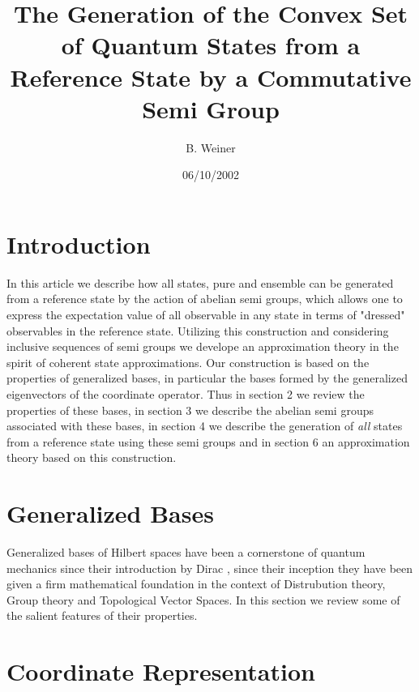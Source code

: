 \documentclass[aps,preprint]{revtex4}%
\begin{document}
\title[State Generation]{The Generation of the Convex Set of Quantum States from a Reference State by a
Commutative Semi Group }
\author{B. Weiner}
\keywords{}
\pacs{}

\begin{abstract}


\end{abstract}
\date{06/10/2002}
\maketitle
\tableofcontents


\section{Introduction}

In this article we describe how all states, pure and ensemble can be generated
from a reference state by the action of abelian semi groups, which allows one
to express the expectation value of all observable in any state in terms of
"dressed" observables in the reference state. Utilizing this construction and
considering inclusive sequences of semi groups we develope an approximation
theory in the spirit of coherent state approximations. Our construction is
based on the properties of generalized bases, in particular the bases formed
by the generalized eigenvectors of the coordinate operator. Thus in section 2
we review the properties of these bases, in section 3 we describe the abelian
semi groups associated with these bases, in section 4 we describe the
generation of \emph{all} states from a reference state using these semi groups
and in section 6 an approximation theory based on this construction.

\section{Generalized Bases}

Generalized bases of Hilbert spaces have been a cornerstone of quantum
mechanics since their introduction by Dirac \cite{Dirac}, since their
inception they have been given a  firm mathematical foundation in the context
of Distrubution theory, Group theory and Topological Vector Spaces. In this
section we review some of the salient features of their properties.

\section{Coordinate Representation}
\end{document}
